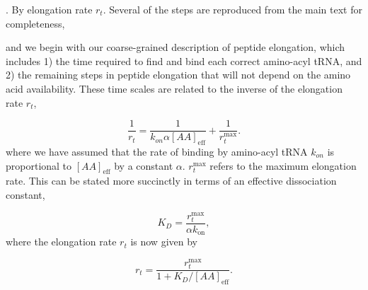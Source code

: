 . By elongation rate $r_t$. Several of the steps are reproduced from the main text for completeness,


and we begin with our coarse-grained description of peptide elongation, which includes 1) the time required to find and bind each
correct amino-acyl tRNA, and 2) the remaining steps in peptide elongation that
will not depend on the amino acid availability. These time scales are related to the inverse of the elongation rate $r_t$,

\begin{equation}
\frac{1}{r_t} = \frac{1}{k_{on} \alpha [AA]_{\text{eff}}} + \frac{1}{r_{t}^{\text{max}}}.
\end{equation}
where we have assumed that the rate of binding by amino-acyl tRNA $k_{on}$ is
proportional to $[AA]_{\text{eff}}$ by a constant $\alpha$. $r_{t}^{\text{max}}$
refers to the maximum elongation rate. This can be stated more
succinctly in terms of an effective dissociation constant,

\begin{equation}
    K_D = \frac{r_{t}^{\text{max}}}{\alpha k_\text{on}},
\end{equation}
where the elongation rate $r_t$ is now given by

\begin{equation}
r_t = \frac{r_{t}^{\text{max}}}{1 + K_D/[AA]_{\text{eff}}}.
\label{eq:rt_kd_simple}
\end{equation}

